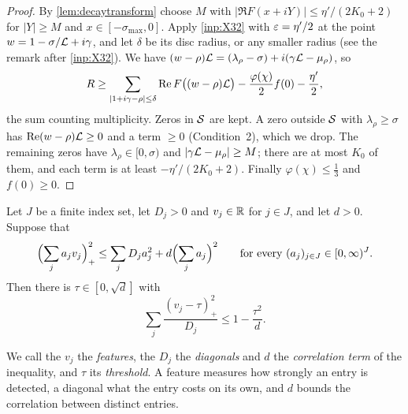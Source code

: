 \begin{proof}
By \cref{lem:decaytransform} choose $M$ with $|\Re F(x+iY)|\le\eta'/(2K_0+2)$ for $|Y|\ge M$ and
$x\in[-\sigma_{\max},0]$. Apply \cref{inp:X32} with $\varepsilon=\eta'/2$ at the point
$w=1-\sigma/\mathcal{L}+i\gamma$, and let $\delta$ be its disc radius, or any smaller radius (see the remark after
\cref{inp:X32}). We have $(w-\rho)\mathcal{L}=
(\lambda_\rho-\sigma)+i(\gamma\mathcal{L}-\mu_\rho)$, so
\[
  R\ge\sum_{|1+i\gamma-\rho|\le\delta}\operatorname{Re} F\bigl((w-\rho)\mathcal{L}\bigr)-\frac{\varphi(\chi)}2f(0)-\frac{\eta'}2 ,
\]
the sum counting multiplicity. Zeros in $\mathcal{S}$ are kept. A zero outside $\mathcal{S}$ with
$\lambda_\rho\ge\sigma$ has $\operatorname{Re}(w-\rho)\mathcal{L}\ge0$ and a term $\ge0$ (Condition~2), which we drop. The
remaining zeros have $\lambda_\rho\in[0,\sigma)$ and $|\gamma\mathcal{L}-\mu_\rho|\ge M$; there are at most $K_0$
of them, and each term is at least $-\eta'/(2K_0+2)$. Finally $\varphi(\chi)\le\frac13$ and
$f(0)\ge0$.
\end{proof}

\begin{proposition}\label{prop:threshold}
Let $J$ be a finite index set, let $D_j>0$ and $v_j\in\mathbb{R}$ for $j\in J$, and let $d>0$.
Suppose that
\[
  \Bigl(\sum_j a_jv_j\Bigr)_+^2\le\sum_jD_ja_j^2+d\Bigl(\sum_j a_j\Bigr)^2
  \qquad\text{for every }(a_j)_{j\in J}\in[0,\infty)^J.
\]
Then there is
$\tau\in[0,\sqrt d]$ with
\begin{equation}\label{eq:T}\tag{T}
  \sum_j\frac{(v_j-\tau)_+^2}{D_j}\le1-\frac{\tau^2}d .
\end{equation}
\end{proposition}

We call the $v_j$ the \emph{features}, the $D_j$ the \emph{diagonals} and $d$ the \emph{correlation term}
of the inequality, and $\tau$ its \emph{threshold}. A feature measures how strongly an entry is
detected, a diagonal what the entry costs on its own, and $d$ bounds the correlation between
distinct entries.

